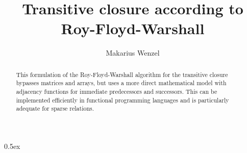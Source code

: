 \documentclass[11pt,a4paper]{article}
\begin{document}
\title{Transitive closure according to Roy-Floyd-Warshall}
\author{Makarius Wenzel}
\maketitle

\begin{abstract}
This formulation of the Roy-Floyd-Warshall algorithm for the transitive
closure bypasses matrices and arrays, but uses a more direct mathematical
model with adjacency functions for immediate predecessors and successors.
This can be implemented efficiently in functional programming languages and
is particularly adequate for sparse relations.
\end{abstract}

\tableofcontents

\parindent 0pt\parskip 0.5ex





\end{document}
